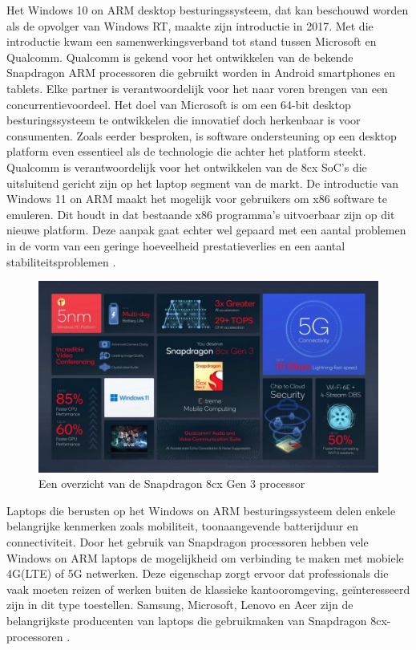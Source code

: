 Het Windows 10 on ARM desktop besturingssysteem, dat kan beschouwd worden als de opvolger van Windows RT, maakte zijn introductie in 2017. Met die introductie kwam een samenwerkingsverband tot stand tussen Microsoft en Qualcomm. Qualcomm is gekend voor het ontwikkelen van de bekende Snapdragon ARM processoren die gebruikt worden in Android smartphones en tablets. Elke partner is verantwoordelijk voor het naar voren brengen van een concurrentievoordeel. Het doel van Microsoft is om een 64-bit desktop besturingssysteem te ontwikkelen die innovatief doch herkenbaar is voor consumenten. Zoals eerder besproken, is software ondersteuning op een desktop platform even essentieel als de technologie die achter het platform steekt. Qualcomm is verantwoordelijk voor het ontwikkelen van de 8cx SoC’s die uitsluitend gericht zijn op het laptop segment van de markt. De introductie van Windows 11 on ARM maakt het mogelijk voor gebruikers om x86 software te emuleren. Dit houdt in dat bestaande x86 programma’s uitvoerbaar zijn op dit nieuwe platform. Deze aanpak gaat echter wel gepaard met een aantal problemen in de vorm van een geringe hoeveelheid prestatieverlies en een aantal stabiliteitsproblemen \autocite{Carrasqueira2022}.

\begin{figure}[!htb]
    \centering
    \includegraphics[width=\linewidth]{img/gsmarena_001.jpg}
    \caption{Een overzicht van de Snapdragon 8cx Gen 3 processor \autocite{Peter2021}}
\end{figure}

Laptops die berusten op het Windows on ARM besturingssysteem delen enkele belangrijke kenmerken zoals mobiliteit, toonaangevende batterijduur en connectiviteit. Door het gebruik van Snapdragon processoren hebben vele Windows on ARM laptops de mogelijkheid om verbinding te maken met mobiele 4G(LTE) of 5G netwerken. Deze eigenschap zorgt ervoor dat professionals die vaak moeten reizen of werken buiten de klassieke kantooromgeving, geïnteresseerd zijn in dit type toestellen. Samsung, Microsoft, Lenovo en Acer zijn de belangrijkste producenten van laptops die gebruikmaken van Snapdragon 8cx-processoren \autocite{Matte2022}.

